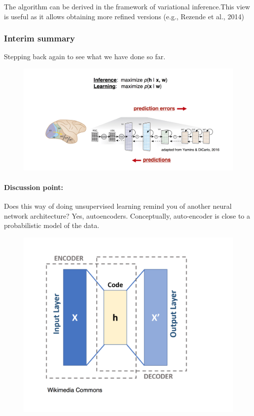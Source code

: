 \documentclass[main]{subfiles}
\begin{document}
The algorithm can be derived in the framework of variational inference.This view is useful as it allows obtaining more refined versions (e.g., Rezende et al., 2014)

\subsubsection{Interim summary}
Stepping back again to see what we have done so far. 
\begin{figure}[H]
        \centering
        \includegraphics[width=0.9\linewidth]{06_PredictionErrorsDuringPerceptionAndLearning/figures/big_picture.png}
        \label{fig:big_picture}
\end{figure}

\paragraph{Discussion point:}Does this way of doing unsupervised learning remind you of another neural network architecture? Yes, autoencoders. Conceptually, auto-encoder is close to a probabilistic model of the data.

\begin{figure}[H]
        \centering
        \includegraphics[width=0.8\linewidth]{06_PredictionErrorsDuringPerceptionAndLearning/figures/autoencoder.png}
        \label{fig:autoencoder}
\end{figure}
\end{document}
